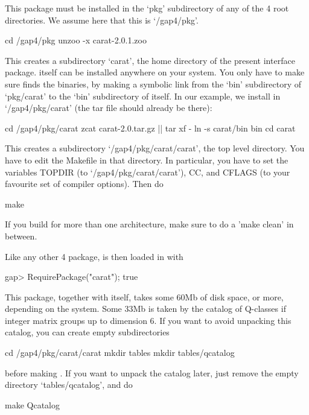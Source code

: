 
This package must be installed in the `pkg' subdirectory of any of
the {\GAP} 4 root directories. We assume here that this is `/gap4/pkg'.

\begintt
cd /gap4/pkg
unzoo -x carat-2.0.1.zoo
\endtt

This creates a subdirectory `carat', the home directory of the present
interface package. {\CARAT} itself can be installed anywhere on your 
system. You only have to make sure {\GAP} finds the {\CARAT} binaries, 
by making a symbolic link from the `bin' subdirectory of `pkg/carat' to 
the `bin' subdirectory of {\CARAT} itself. In our example, we install 
{\CARAT} in `/gap4/pkg/carat' (the {\CARAT} tar file should already be 
there):

\begintt
cd /gap4/pkg/carat
zcat carat-2.0.tar.gz || tar xf -
ln -s carat/bin bin
cd carat
\endtt

This creates a subdirectory `/gap4/pkg/carat/carat', the {\CARAT} top level
directory. You have to edit the Makefile in that directory. In particular,
you have to set the variables TOPDIR (to `/gap4/pkg/carat/carat'), CC, and
CFLAGS (to your favourite set of compiler options). Then do 

\begintt
make
\endtt

If you build for more than one architecture, make sure to do a 
'make clean' in between.

Like any other {\GAP} 4 package, {\CARAT} is then loaded in {\GAP} with

\beginexample
gap> RequirePackage("carat");
true
\endexample

This package, together with {\CARAT} itself, takes some 60Mb of disk space,
or more, depending on the system. Some 33Mb is taken by the catalog
of Q-classes if integer matrix groups up to dimension 6. If you want
to avoid unpacking this catalog, you can create empty subdirectories

\begintt
cd /gap4/pkg/carat/carat
mkdir tables
mkdir tables/qcatalog
\endtt

before making {\CARAT}. If you want to unpack the catalog later, just
remove the empty directory `tables/qcatalog', and do

\begintt
make Qcatalog
\endtt


